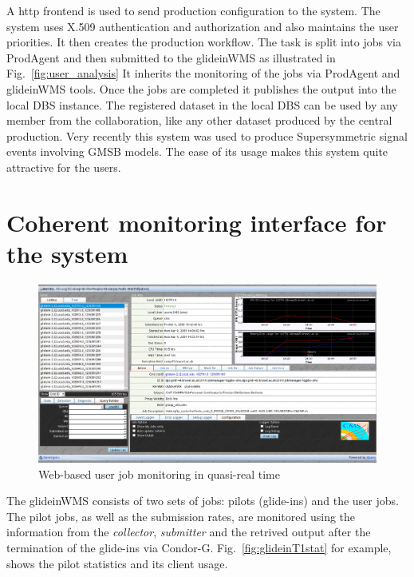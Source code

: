 \documentclass[a4paper]{jpconf}
\begin{document}
A http frontend is used to send production configuration to the system. 
The system uses X.509 authentication and authorization and also maintains the user priorities. 
It then creates the production workflow. The task is split into jobs via ProdAgent and then 
submitted to the glideinWMS as illustrated in Fig.~\ref{fig:user_analysis} It inherits the monitoring of the 
jobs via ProdAgent and glideinWMS tools. 
Once the jobs are completed it publishes the output into the local DBS instance. The registered 
dataset in the local DBS can be used by any member from the collaboration, like any other dataset produced 
by the central production. Very recently this system was used to produce Supersymmetric signal
events involving GMSB models. The ease of its usage makes this system quite attractive
for the users.
\section{Coherent monitoring interface for the system}
\begin{figure}
\begin{center}
\includegraphics[scale=0.4]{jobMon.png}
\end{center}
\caption{Web-based user job monitoring in quasi-real time}
\label{fig:jobMon}
\end{figure}
The glideinWMS consists of two sets of jobs: pilots (glide-ins) and the user jobs. The
pilot jobs, as well as the submission rates, are monitored using the information from the \emph{collector},
\emph{submitter} and the retrived output after the termination of the glide-ins via Condor-G.
Fig.~\ref{fig:glideinT1stat} for example, shows the pilot statistics and its client usage.
\end{document}
